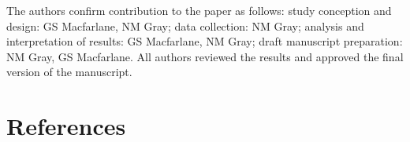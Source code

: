 \documentclass[
  letterpaper,
]{trb}
\begin{document}

The authors confirm contribution to the paper as follows: study
conception and design: GS Macfarlane, NM Gray; data collection: NM Gray;
analysis and interpretation of results: GS Macfarlane, NM Gray; draft
manuscript preparation: NM Gray, GS Macfarlane. All authors reviewed the
results and approved the final version of the manuscript.


\hypertarget{references}{%
\section*{References}\label{references}}

\end{document}

